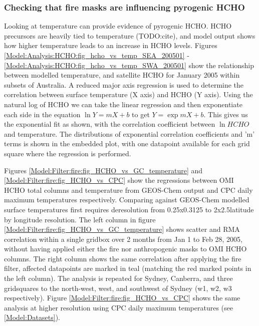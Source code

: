   
    \subsubsection{Checking that fire masks are influencing pyrogenic HCHO}
      
      Looking at temperature can provide evidence of pyrogenic HCHO.
      HCHO precursors are heavily tied to temperature (TODO:cite), and model output shows how higher temperature leads to an increase in HCHO levels.
      Figures \ref{Model:Analysis:HCHO:fig_hcho_vs_temp_SEA_200501} - \ref{Model:Analysis:HCHO:fig_hcho_vs_temp_SWA_200501} show the relationship between modelled temperature, and satellite HCHO for January 2005 within subsets of Australia.
      A reduced major axis regression is used to determine the correlation between surface temperature (X axis) and HCHO (Y axis).
      Using the natural log of HCHO we can take the linear regression and then exponentiate each side in the equation $\ln{Y} = m{X}+b$ to get ${Y} = \exp{m{X}+b}$. 
      This gives us the exponential fit as shown, with the correlation coefficient between $\ln{HCHO}$ and temperature.
      The distributions of exponential correlation coefficients and 'm' terms is shown in the embedded plot, with one datapoint available for each grid square where the regression is performed.
      
      Figures \ref{Model:Filter:fire:fig_HCHO_vs_GC_temperature} and \ref{Model:Filter:fire:fig_HCHO_vs_CPC} show the regressions between OMI HCHO total columns and temperature from GEOS-Chem output and CPC daily maximum temperatures respectively.
      Comparing against GEOS-Chem modelled surface temperatures first requires deresolution from 0.25x0.3125 to 2x2.5\degr latitude by longitude resolution.
      The left column in figure \ref{Model:Filter:fire:fig_HCHO_vs_GC_temperature} shows scatter and RMA correlation within a single gridbox over 2 months from Jan 1 to Feb 28, 2005, without having applied either the fire nor anthropogenic masks to OMI HCHO columns. 
      The right column shows the same correlation after applying the fire filter, affected datapoints are marked in teal (matching the red marked points in the left column).
      The analysis is repeated for Sydney, Canberra, and three gridsquares to the north-west, west, and southwest of Sydney (w1, w2, w3 respectively).
      Figure \ref{Model:Filter:fire:fig_HCHO_vs_CPC} shows the same analysis at higher resolution using CPC daily maximum temperatures (see \ref{Model:Datasets}).
      
